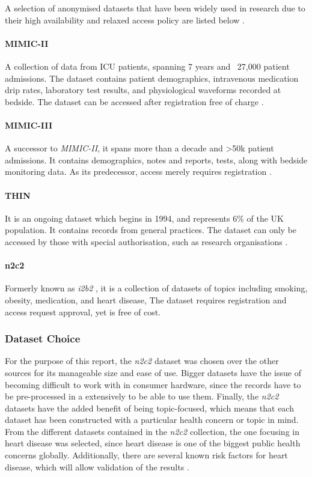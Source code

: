 \documentclass[a4paper,12pt]{article}
\begin{document}
A selection of anonymised datasets that have been widely used in research due to
their high availability and relaxed access policy are listed below \parencite{Dalianis2015}.

\paragraph{MIMIC-II} A collection of data from ICU patients,
spanning 7 years and ~27,000 patient admissions.
The dataset contains patient demographics, intravenous medication drip rates,
laboratory test results, and physiological waveforms recorded at bedside.
The dataset can be accessed after registration free of charge \parencite{Lee2011}.

\paragraph{MIMIC-III} A successor to \textit{MIMIC-II}, it spans more than a
decade and \textgreater 50k patient admissions.
It contains demographics, notes and reports, tests, along with bedside monitoring data.
As its predecessor, access merely requires registration \parencite{Johnson2016}.

\paragraph{THIN} It is an ongoing dataset which begins in 1994, and represents
6\% of the UK population.
It contains records from general practices.
The dataset can only be accessed by those with special authorisation,
such as research organisations \parencite{Lewis2007}.

\paragraph{n2c2} Formerly known as \textit{i2b2} , it is a collection of datasets
of topics including smoking, obesity, medication, and heart disease,
The dataset requires registration and access request approval, yet is free of cost.

\subsubsection{Dataset Choice}

For the purpose of this report, the \textit{n2c2} dataset was chosen over the
other sources for its manageable size and ease of use.
Bigger datasets have the issue of becoming difficult to work with in consumer hardware,
since the records have to be pre-processed in a extensively to be able to use them.
Finally, the \textit{n2c2} datasets have the added benefit of being topic-focused,
which means that each dataset has been constructed with a particular health concern
or topic in mind.
From the different datasets contained in the \textit{n2c2} collection,
the one focusing in heart disease was selected, since heart disease is one of
the biggest public health concerns globally.
Additionally, there are several known risk factors for heart disease, which will
allow validation of the results \parencite{Kannel2002}.
\end{document}

